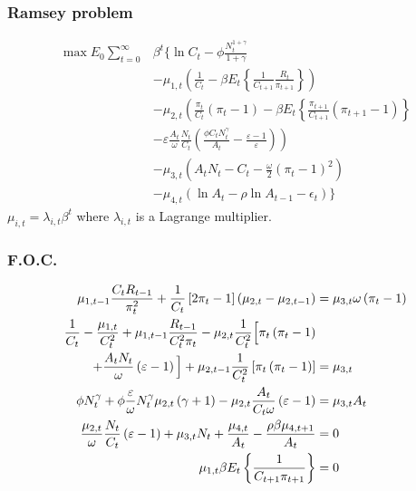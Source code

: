 \documentclass{beamer}
\begin{document}
\begin{frame}\frametitle{Ramsey problem}
\begin{align*}
\max E_{0}\sum_{t=0}^\infty &\beta ^{t}\Bigg\{ \ln C_{t}-\phi \frac{N_{t}^{1+\gamma }}{1+\gamma } \\
&-\mu_{1,t}\left( \frac{1}{C_{t}}-\beta E_{t}\left \{ \frac{1}{C_{t+1}}%
\frac{R_{t}}{\pi_{t+1}}\right \} \right) \\
&-\mu_{2,t}\left( \frac{\pi _{t}}{C_{t}}\left( \pi _{t}-1\right)
-\beta E_{t}\left \{ \frac{\pi _{t+1}}{C_{t+1}}\left( \pi _{t+1}-1\right)
\right \} \right.\\
&\left.-\varepsilon \frac{A_{t}}{\omega }\frac{N_{t}}{C_{t}}\left(
\frac{\phi C_t N_{t}^{\gamma }}{A_{t}}-\frac{\varepsilon -1}{\varepsilon }%
\right) \right) \\
&-\mu _{3,t}\left( A_{t}N_{t}-C_{t}-\frac{\omega }{2}\left( \pi
_{t}-1\right) ^{2}\right)\\
&-\mu_{4,t}\left(\ln A_t - \rho\ln A_{t-1} - \epsilon_t\right)\Bigg\}
\end{align*}%
$\mu_{i,t} = \lambda_{i,t}\beta^t$ where $\lambda_{i,t}$ is a Lagrange multiplier. 
\end{frame}

\begin{frame}\frametitle{F.O.C.}
\begin{align*}
\mu_{1,t-1}\frac{C_tR_{t-1}}{\pi^2_t}+
\frac{1}{C_{t}}\left[ 2\pi _{t}-1\right] \left( \mu _{2,t}-\mu
_{2,t-1}\right) &=\mu _{3,t}\omega \left( \pi _{t}-1\right)\\
\frac{1}{C_{t}}-\frac{\mu_{1,t}}{C_t^2}+\mu_{1,t-1}\frac{R_{t-1}}{C^2_t\pi_t}-\mu _{2,t}\frac{1}{C_{t}^{2}}\Big[ \pi _{t}\left( \pi
_{t}-1\right)\\
 +\frac{A_{t}N_{t}}{\omega }\left( \varepsilon -1\right) \Big]
+\mu _{2,t-1}\frac{1}{C_{t}^{2}}\left[ \pi _{t}\left( \pi _{t}-1\right) %
\right] &=\mu _{3,t}\\
\phi N_{t}^{\gamma }+\phi \frac{\varepsilon }{\omega }N_{t}^{\gamma
}\mu _{2,t}\left( \gamma +1\right) -\mu _{2,t}\frac{A_{t}}{%
C_{t}\omega }\left( \varepsilon -1\right) &=\mu _{3,t}A_{t}\\
\frac{\mu_{2,t}}{\omega }\frac{N_{t}}{C_{t}}\left(\varepsilon -1\right)+\mu_{3,t}N_t+\frac{\mu_{4,t}}{A_t}-\frac{\rho\beta\mu_{4,t+1}}{A_t} &= 0\\
\mu_{1,t}\beta E_{t}\left \{ \frac{1}{C_{t+1}\pi_{t+1}}\right \}&=0
\end{align*}
\end{frame}
\end{document}
